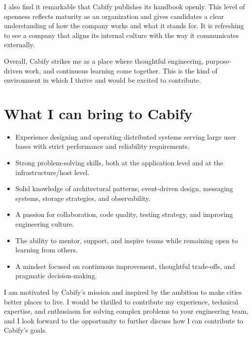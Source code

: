 \documentclass[11pt,a4paper,sans]{moderncv}
\begin{document}
\begin{justify}
I also find it remarkable that Cabify publishes its handbook openly. This level of openness reflects maturity as an organization and gives candidates a clear understanding of how the company works and what it stands for. It is refreshing to see a company that aligns its internal culture with the way it communicates externally.

Overall, Cabify strikes me as a place where thoughtful engineering, purpose-driven work, and continuous learning come together. This is the kind of environment in which I thrive and would be excited to contribute.

\section{What I can bring to Cabify}

\begin{itemize}
\item Experience designing and operating distributed systems serving large user bases with strict performance and reliability requirements.
\item Strong problem-solving skills, both at the application level and at the infrastructure/host level.
\item Solid knowledge of architectural patterns, event-driven design, messaging systems, storage strategies, and observability.
\item A passion for collaboration, code quality, testing strategy, and improving engineering culture.
\item The ability to mentor, support, and inspire teams while remaining open to learning from others.
\item A mindset focused on continuous improvement, thoughtful trade-offs, and pragmatic decision-making.
\end{itemize}

I am motivated by Cabify's mission and inspired by the ambition to make cities better places to live. I would be thrilled to contribute my experience, technical expertise, and enthusiasm for solving complex problems to your engineering team, and I look forward to the opportunity to further discuss how I can contribute to Cabify's goals.

\end{justify}

\makeletterclosing
\end{document}
